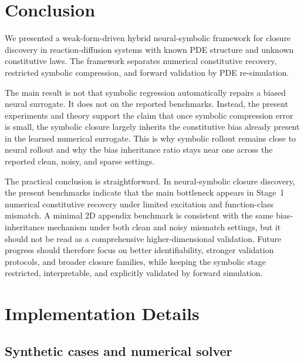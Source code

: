 \documentclass[preprint,12pt]{elsarticle}
\begin{document}
\section{Conclusion}

We presented a weak-form-driven hybrid neural-symbolic framework for closure discovery in reaction-diffusion systems with known PDE structure and unknown constitutive laws. The framework separates numerical constitutive recovery, restricted symbolic compression, and forward validation by PDE re-simulation.

The main result is not that symbolic regression automatically repairs a biased neural surrogate. It does not on the reported benchmarks. Instead, the present experiments and theory support the claim that once symbolic compression error is small, the symbolic closure largely inherits the constitutive bias already present in the learned numerical surrogate. This is why symbolic rollout remains close to neural rollout and why the bias inheritance ratio stays near one across the reported clean, noisy, and sparse settings.

The practical conclusion is straightforward. In neural-symbolic closure discovery, the present benchmarks indicate that the main bottleneck appears in Stage~1 numerical constitutive recovery under limited excitation and function-class mismatch. A minimal 2D appendix benchmark is consistent with the same bias-inheritance mechanism under both clean and noisy mismatch settings, but it should not be read as a comprehensive higher-dimensional validation. Future progress should therefore focus on better identifiability, stronger validation protocols, and broader closure families, while keeping the symbolic stage restricted, interpretable, and explicitly validated by forward simulation.




\appendix

\section{Implementation Details}

\subsection{Synthetic cases and numerical solver}
\end{document}
